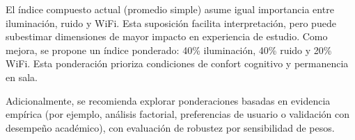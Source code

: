 El índice compuesto actual (promedio simple) asume igual importancia entre iluminación, ruido y WiFi. Esta suposición facilita interpretación, pero puede subestimar dimensiones de mayor impacto en experiencia de estudio. Como mejora, se propone un índice ponderado: 40\% iluminación, 40\% ruido y 20\% WiFi. Esta ponderación prioriza condiciones de confort cognitivo y permanencia en sala.

Adicionalmente, se recomienda explorar ponderaciones basadas en evidencia empírica (por ejemplo, análisis factorial, preferencias de usuario o validación con desempeño académico), con evaluación de robustez por sensibilidad de pesos.
